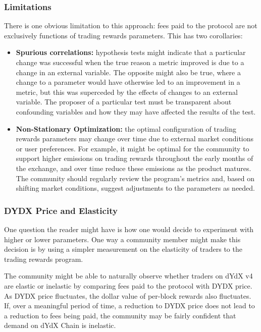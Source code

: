        \subsubsection{Limitations}

            There is one obvious limitation to this approach: fees paid to the protocol are not exclusively functions of trading rewards parameters. This has two corollaries:

            \begin{itemize}
                \item \textbf{Spurious correlations:} hypothesis tests might indicate that a particular change was successful when the true reason a metric improved is due to a change in an external variable. The opposite might also be true, where a change to a parameter would have otherwise led to an improvement in a metric, but this was superceded by the effects of changes to an external variable. The proposer of a particular test must be transparent about confounding variables and how they may have affected the results of the test.
                \item \textbf{Non-Stationary Optimization:} the optimal configuration of trading rewards parameters may change over time due to external market conditions or user preferences. For example, it might be optimal for the community to support higher emissions on trading rewards throughout the early months of the exchange, and over time reduce these emissions as the product matures. The community should regularly review the program's metrics and, based on shifting market conditions, suggest adjustments to the parameters as needed.
            \end{itemize}

        \subsubsection{DYDX Price and Elasticity}

            One question the reader might have is how one would decide to experiment with higher or lower parameters. One way a community member might make this decision is by using a simpler measurement on the elasticity of traders to the trading rewards program.

            The community might be able to naturally observe whether traders on dYdX v4 are elastic or inelastic by comparing fees paid to the protocol with DYDX price. As DYDX price fluctuates, the dollar value of per-block rewards also fluctuates. If, over a meaningful period of time, a reduction to DYDX price does not lead to a reduction to fees being paid, the community may be fairly confident that demand on dYdX Chain is inelastic.

